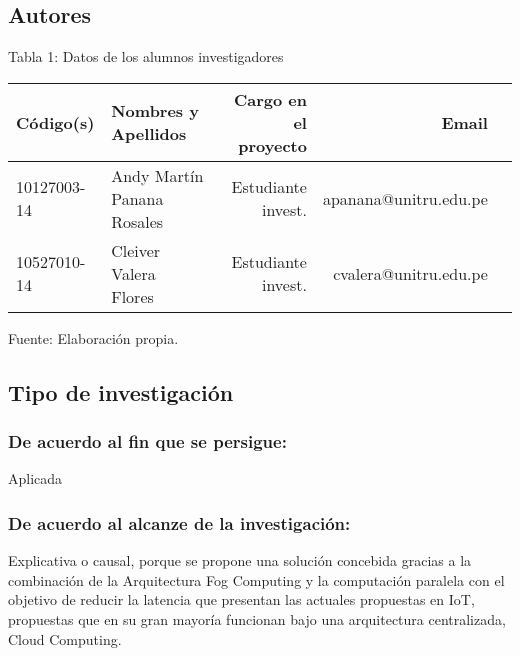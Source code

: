 \subsection{Autores}
\begin{center}
    
    \begin{table}[!ht]
        \centering
        { Tabla 1: Datos de los alumnos investigadores }\par 
        \begin{tabular}{llrrr} \toprule
        {\bf Código(s)} & {\bf Nombres y Apellidos} & {\bf Cargo en el proyecto} & {\bf Email} \\ \midrule
        10127003-14 & Andy Martín Panana Rosales & Estudiante invest. & apanana@unitru.edu.pe           \\
        10527010-14    & Cleiver Valera Flores & Estudiante invest. & cvalera@unitru.edu.pe            \\ \bottomrule
        
        \end{tabular}
        \begin{center}
            \vskip 0.2cm
            {\small{Fuente: Elaboración propia.}}
        \end{center}
    \end{table}    
\end{center}

\subsection{Tipo de investigación}
    \subsubsection{De acuerdo al fin que se persigue:} 
    Aplicada
                    
    \subsubsection{De acuerdo al alcanze de la investigación:} 
    Explicativa o causal, porque se propone una solución concebida gracias a la combinación de la Arquitectura Fog Computing y la computación paralela con el objetivo de reducir la latencia que presentan las actuales propuestas en IoT, propuestas que en su gran mayoría funcionan bajo una arquitectura centralizada, Cloud Computing.

